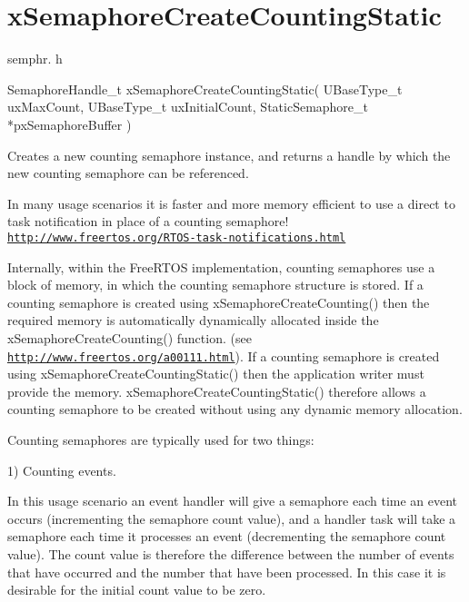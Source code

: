 \hypertarget{group__x_semaphore_create_counting_static}{}\section{x\+Semaphore\+Create\+Counting\+Static}
\label{group__x_semaphore_create_counting_static}
semphr. h 
\begin{DoxyPre}SemaphoreHandle\_t xSemaphoreCreateCountingStatic( UBaseType\_t uxMaxCount, UBaseType\_t uxInitialCount, StaticSemaphore\_t *pxSemaphoreBuffer )\end{DoxyPre}


Creates a new counting semaphore instance, and returns a handle by which the new counting semaphore can be referenced.

In many usage scenarios it is faster and more memory efficient to use a direct to task notification in place of a counting semaphore! \href{http://www.freertos.org/RTOS-task-notifications.html}{\tt http\+://www.\+freertos.\+org/\+R\+T\+O\+S-\/task-\/notifications.\+html}

Internally, within the Free\+R\+T\+OS implementation, counting semaphores use a block of memory, in which the counting semaphore structure is stored. If a counting semaphore is created using x\+Semaphore\+Create\+Counting() then the required memory is automatically dynamically allocated inside the x\+Semaphore\+Create\+Counting() function. (see \href{http://www.freertos.org/a00111.html}{\tt http\+://www.\+freertos.\+org/a00111.\+html}). If a counting semaphore is created using x\+Semaphore\+Create\+Counting\+Static() then the application writer must provide the memory. x\+Semaphore\+Create\+Counting\+Static() therefore allows a counting semaphore to be created without using any dynamic memory allocation.

Counting semaphores are typically used for two things\+:

1) Counting events.

In this usage scenario an event handler will \textquotesingle{}give\textquotesingle{} a semaphore each time an event occurs (incrementing the semaphore count value), and a handler task will \textquotesingle{}take\textquotesingle{} a semaphore each time it processes an event (decrementing the semaphore count value). The count value is therefore the difference between the number of events that have occurred and the number that have been processed. In this case it is desirable for the initial count value to be zero.

